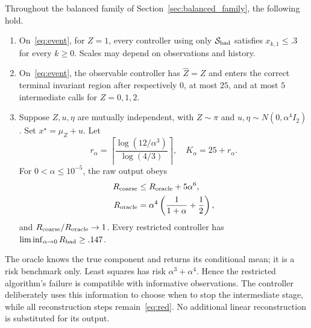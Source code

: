 \begin{theorem}\label{thm:main}
Throughout the balanced family of Section~\ref{sec:balanced_family}, the following hold.
\begin{enumerate}
\item On~\eqref{eq:event}, for $Z=1$, every controller using only $\mathcal S_{\mathrm{bad}}$ satisfies $x_{k,1}\le.3$ for every $k\ge0$. Scales may depend on observations and history.
\item On~\eqref{eq:event}, the observable controller has $\widehat Z=Z$ and enters the correct terminal invariant region after respectively $0$, at most $25$, and at most $5$ intermediate calls for $Z=0,1,2$.
\item Suppose $Z,u,\eta$ are mutually independent, with $Z\sim\pi$ and $u,\eta\sim N(0,\alpha^4I_2)$. Set $x^\star=\mu_Z+u$. Let
\begin{equation}
r_\alpha=\left\lceil\frac{\log(12/\alpha^3)}{\log(4/3)}\right\rceil,\quad K_\alpha=25+r_\alpha.
\end{equation}
For $0<\alpha\le10^{-5}$, the raw output obeys
\begin{align}
R_{\rm coarse}&\le R_{\rm oracle}+5\alpha^6,\label{eq:risk}\\
R_{\rm oracle}&=\alpha^4\left(\frac1{1+\alpha}+\frac12\right),
\end{align}
and $R_{\rm coarse}/R_{\rm oracle}\to1$. Every restricted controller has $\liminf_{\alpha\to0}R_{\rm bad}\ge.147$.
\end{enumerate}
\end{theorem}

The oracle knows the true component and returns its conditional mean; it is a risk benchmark only. Least squares has risk $\alpha^3+\alpha^4$. Hence the restricted algorithm's failure is compatible with informative observations. The controller deliberately uses this information to choose when to stop the intermediate stage, while all reconstruction steps remain~\eqref{eq:red}. No additional linear reconstruction is substituted for its output.


